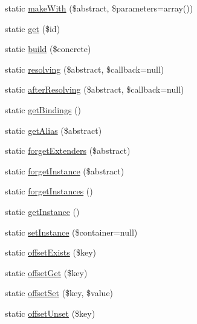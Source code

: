 \begin{DoxyCompactItemize}
\item 
static \mbox{\hyperlink{class_illuminate_1_1_support_1_1_facades_1_1_app_a21185e146da59bcf6b7e5dfb658af27e}{make\+With}} (\$abstract, \$parameters=array())
\item 
static \mbox{\hyperlink{class_illuminate_1_1_support_1_1_facades_1_1_app_a042054c3892563f7f0b31cb9e1c9bb76}{get}} (\$id)
\item 
static \mbox{\hyperlink{class_illuminate_1_1_support_1_1_facades_1_1_app_afc58bf4ad412d93583b845767132ac6a}{build}} (\$concrete)
\item 
static \mbox{\hyperlink{class_illuminate_1_1_support_1_1_facades_1_1_app_a9f7b165d7ce251ca9f5a8151efc7cf81}{resolving}} (\$abstract, \$callback=null)
\item 
static \mbox{\hyperlink{class_illuminate_1_1_support_1_1_facades_1_1_app_a51d11cc845124fdb0f345deffac0246c}{after\+Resolving}} (\$abstract, \$callback=null)
\item 
static \mbox{\hyperlink{class_illuminate_1_1_support_1_1_facades_1_1_app_aa54235f81ed08702ae31cfc2cd4f8f2a}{get\+Bindings}} ()
\item 
static \mbox{\hyperlink{class_illuminate_1_1_support_1_1_facades_1_1_app_a332b40e237f5eed64e3b5c26a9198922}{get\+Alias}} (\$abstract)
\item 
static \mbox{\hyperlink{class_illuminate_1_1_support_1_1_facades_1_1_app_a45a3221fbedd5979dd94c53588d57788}{forget\+Extenders}} (\$abstract)
\item 
static \mbox{\hyperlink{class_illuminate_1_1_support_1_1_facades_1_1_app_a247958d883cadf721387a38630e09206}{forget\+Instance}} (\$abstract)
\item 
static \mbox{\hyperlink{class_illuminate_1_1_support_1_1_facades_1_1_app_ae2ba5f8713c76ac249c9c1284e656dca}{forget\+Instances}} ()
\item 
static \mbox{\hyperlink{class_illuminate_1_1_support_1_1_facades_1_1_app_a804a809eeccf0c334dd07c079029bee3}{get\+Instance}} ()
\item 
static \mbox{\hyperlink{class_illuminate_1_1_support_1_1_facades_1_1_app_a175fcd9533e4df56e2b8bb161e7d3c4a}{set\+Instance}} (\$container=null)
\item 
static \mbox{\hyperlink{class_illuminate_1_1_support_1_1_facades_1_1_app_a998154ab84d493b5d6a4b4df8cc219e1}{offset\+Exists}} (\$key)
\item 
static \mbox{\hyperlink{class_illuminate_1_1_support_1_1_facades_1_1_app_a97d7d94e05f76b4f6d210129a0755283}{offset\+Get}} (\$key)
\item 
static \mbox{\hyperlink{class_illuminate_1_1_support_1_1_facades_1_1_app_a9d295382cd64e5055d031c71a0edecaf}{offset\+Set}} (\$key, \$value)
\item 
static \mbox{\hyperlink{class_illuminate_1_1_support_1_1_facades_1_1_app_a9fed51d2c46e6cc3d943f9835c42628f}{offset\+Unset}} (\$key)
\end{DoxyCompactItemize}


